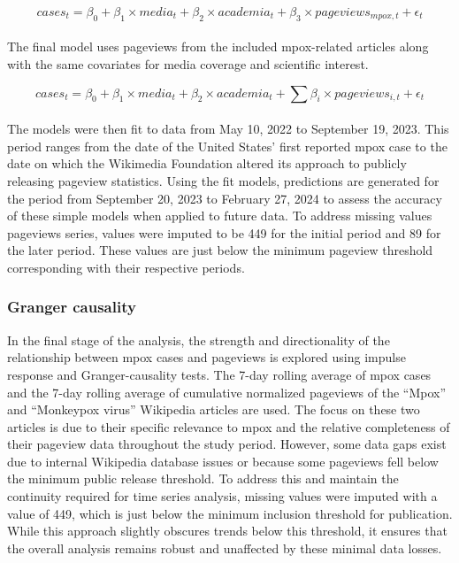 \documentclass[
  12pt,
]{article}
\begin{document}
\hfill\break
\[
cases_t = \beta_0 + \beta_1 \times media_t + \beta_2 \times academia_t + \beta_3 \times   pageviews_{mpox, t}+ \epsilon_t
\]\\

The final model uses pageviews from the included mpox-related articles
along with the same covariates for media coverage and scientific
interest.

\[
cases_t = \beta_0 + \beta_1 \times media_t + \beta_2 \times academia_t + \sum \beta_i \times pageviews_{i, t}+ \epsilon_t
\]\\

The models were then fit to data from May 10, 2022 to September 19,
2023. This period ranges from the date of the United States' first
reported mpox case to the date on which the Wikimedia Foundation altered
its approach to publicly releasing pageview statistics. Using the fit
models, predictions are generated for the period from September 20, 2023
to February 27, 2024 to assess the accuracy of these simple models when
applied to future data. To address missing values pageviews series,
values were imputed to be 449 for the initial period and 89 for the
later period. These values are just below the minimum pageview threshold
corresponding with their respective periods.

\subsubsection{Granger causality}\label{granger-causality}

In the final stage of the analysis, the strength and directionality of
the relationship between mpox cases and pageviews is explored using
impulse response and Granger-causality tests. The 7-day rolling average
of mpox cases and the 7-day rolling average of cumulative normalized
pageviews of the ``Mpox'' and ``Monkeypox virus'' Wikipedia articles are
used. The focus on these two articles is due to their specific relevance
to mpox and the relative completeness of their pageview data throughout
the study period. However, some data gaps exist due to internal
Wikipedia database issues or because some pageviews fell below the
minimum public release threshold. To address this and maintain the
continuity required for time series analysis, missing values were
imputed with a value of 449, which is just below the minimum inclusion
threshold for publication. While this approach slightly obscures trends
below this threshold, it ensures that the overall analysis remains
robust and unaffected by these minimal data losses.
\end{document}

